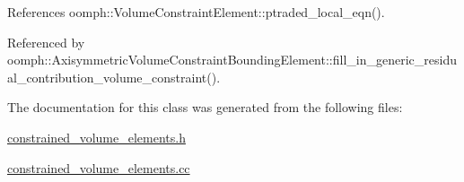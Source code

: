 References oomph\+::\+Volume\+Constraint\+Element\+::ptraded\+\_\+local\+\_\+eqn().



Referenced by oomph\+::\+Axisymmetric\+Volume\+Constraint\+Bounding\+Element\+::fill\+\_\+in\+\_\+generic\+\_\+residual\+\_\+contribution\+\_\+volume\+\_\+constraint().



The documentation for this class was generated from the following files\+:\begin{DoxyCompactItemize}
\item 
\hyperlink{constrained__volume__elements_8h}{constrained\+\_\+volume\+\_\+elements.\+h}\item 
\hyperlink{constrained__volume__elements_8cc}{constrained\+\_\+volume\+\_\+elements.\+cc}\end{DoxyCompactItemize}
